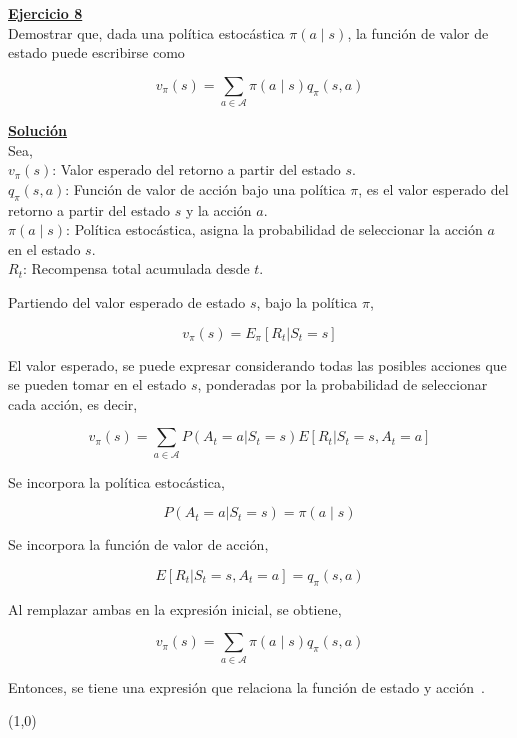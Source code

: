 \indent\underline{\textbf{Ejercicio 8}}\\
Demostrar que, dada una política estocástica $\pi (a \mid s)$, la función de valor de estado puede escribirse como

\[
    v_{\pi}(s) = \sum_{a \in \mathcal{A}} \pi(a \mid s) q_{\pi}(s, a)
\]

\indent\underline{\textbf{Solución}}\\
Sea,\\
$v_{\pi}(s)$: Valor esperado del retorno a partir del estado $s$.\\
$q_{\pi}(s, a)$: Función de valor de acción bajo una política $\pi$, es el valor esperado del retorno a partir del estado $s$ y la acción $a$.\\
$\pi(a \mid s)$: Política estocástica, asigna la probabilidad de seleccionar la acción $a$ en el estado $s$.\\
$R_t$: Recompensa total acumulada desde $t$.

Partiendo del valor esperado de estado $s$, bajo la política $\pi$,

\[
    v_{\pi}(s) = E_{\pi}[R_t | S_t = s]
\]

El valor esperado, se puede expresar considerando todas las posibles acciones que se pueden tomar en el estado $s$, ponderadas por la probabilidad de seleccionar cada acción, es decir,

\[
    v_{\pi}(s)= \sum_{a \in \mathcal{A}} P(A_t = a | S_t = s) E[R_t | S_t = s, A_t = a]
\]

Se incorpora la política estocástica,

\[
    P(A_t = a | S_t = s) = \pi(a \mid s)
\]

Se incorpora la función de valor de acción,

\[
    E[R_t | S_t = s, A_t = a] = q_{\pi}(s, a)
\]

Al remplazar ambas en la expresión inicial, se obtiene,

\[
    v_{\pi}(s) = \sum_{a \in \mathcal{A}} \pi(a \mid s) q_{\pi}(s, a)
\]

Entonces, se tiene una expresión que relaciona la función de estado y acción~\cite{Sutton2018}.

\line(1,0){\textwidth}
